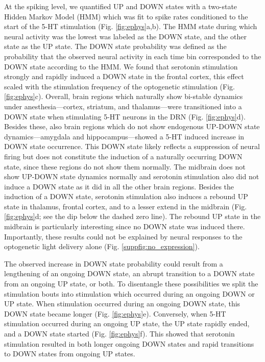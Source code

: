 \documentclass[11pt,a4paper,onecolumn]{article}
\begin{document}
At the spiking level, we quantified UP and DOWN states with a two-state Hidden Markov Model (HMM) which was fit to spike rates conditioned to the start of the 5-HT stimulation (Fig. \ref{fig:ephys}a,b). The HMM state during which neural activity was the lowest was labeled as the DOWN state, and the other state as the UP state. The DOWN state probability was defined as the probability that the observed neural activity in each time bin corresponded to the DOWN state according to the HMM. We found that serotonin stimulation strongly and rapidly induced a DOWN state in the frontal cortex, this effect scaled with the stimulation frequency of the optogenetic stimulation (Fig. \ref{fig:ephys}c). Overall, brain regions which naturally show bi-stable dynamics under anesthesia—cortex, striatum, and thalamus—were transitioned into a DOWN state when stimulating 5-HT neurons in the DRN (Fig. \ref{fig:ephys}d). Besides these, also brain regions which do not show endogenous UP-DOWN state dynamics—amygdala and hippocampus—showed a 5-HT induced increase in DOWN state occurrence. This DOWN state likely reflects a suppression of neural firing but does not constitute the induction of a naturally occurring DOWN state, since these regions do not show them normally. The midbrain does not show UP-DOWN state dynamics normally and serotonin stimulation also did not induce a DOWN state as it did in all the other brain regions. Besides the induction of a DOWN state, serotonin stimulation also induces a rebound UP state in thalamus, frontal cortex, and to a lesser extend in the midbrain (Fig. \ref{fig:ephys}d; see the dip below the dashed zero line). The rebound UP state in the midbrain is particularly interesting since no DOWN state was induced there. Importantly, these results could not be explained by neural responses to the optogenetic light delivery alone (Fig. \ref{suppfig:no_expression}).

The observed increase in DOWN state probability could result from a lengthening of an ongoing DOWN state, an abrupt transition to a DOWN state from an ongoing UP state, or both. To disentangle these possibilities we split the stimulation bouts into stimulation which occurred during an ongoing DOWN or UP state. When stimulation occurred during an ongoing DOWN state, this DOWN state became longer (Fig. \ref{fig:ephys}e). Conversely, when 5-HT stimulation occurred during an ongoing UP state, the UP state rapidly ended, and a DOWN state started (Fig. \ref{fig:ephys}f). This showed that serotonin stimulation resulted in both longer ongoing DOWN states and rapid transitions to DOWN states from ongoing UP states.
\end{document}
